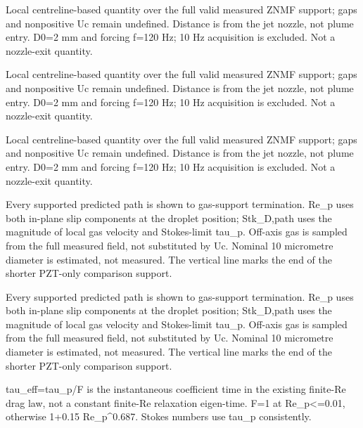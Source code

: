\caption{Local centreline-based quantity over the full valid measured ZNMF support; gaps and nonpositive Uc remain undefined. Distance is from the jet nozzle, not plume entry. D0=2 mm and forcing f=120 Hz; 10 Hz acquisition is excluded. Not a nozzle-exit quantity.}

\caption{Local centreline-based quantity over the full valid measured ZNMF support; gaps and nonpositive Uc remain undefined. Distance is from the jet nozzle, not plume entry. D0=2 mm and forcing f=120 Hz; 10 Hz acquisition is excluded. Not a nozzle-exit quantity.}

\caption{Local centreline-based quantity over the full valid measured ZNMF support; gaps and nonpositive Uc remain undefined. Distance is from the jet nozzle, not plume entry. D0=2 mm and forcing f=120 Hz; 10 Hz acquisition is excluded. Not a nozzle-exit quantity.}

\caption{Every supported predicted path is shown to gas-support termination. Re\_p uses both in-plane slip components at the droplet position; Stk\_D,path uses the magnitude of local gas velocity and Stokes-limit tau\_p. Off-axis gas is sampled from the full measured field, not substituted by Uc. Nominal 10 micrometre diameter is estimated, not measured. The vertical line marks the end of the shorter PZT-only comparison support.}

\caption{Every supported predicted path is shown to gas-support termination. Re\_p uses both in-plane slip components at the droplet position; Stk\_D,path uses the magnitude of local gas velocity and Stokes-limit tau\_p. Off-axis gas is sampled from the full measured field, not substituted by Uc. Nominal 10 micrometre diameter is estimated, not measured. The vertical line marks the end of the shorter PZT-only comparison support.}

\caption{tau\_eff=tau\_p/F is the instantaneous coefficient time in the existing finite-Re drag law, not a constant finite-Re relaxation eigen-time. F=1 at Re\_p<=0.01, otherwise 1+0.15 Re\_p^0.687. Stokes numbers use tau\_p consistently.}
